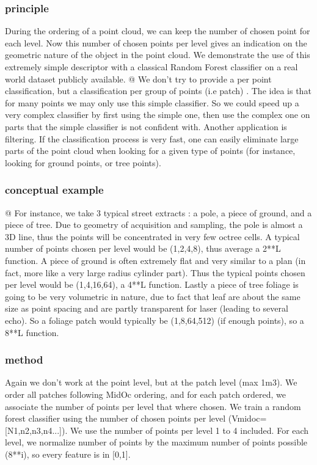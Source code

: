 		\subsubsection{principle}
			During the ordering of a point cloud, we can keep the number of chosen point for each level.
			Now this number of chosen points per level gives an indication on the geometric nature of the object in the point cloud. 
			We demonstrate the use of this extremely simple descriptor with a classical Random Forest classifier on a real world dataset publicly available.
			@
			We don't try to provide a per point classification, but a classification per group of points (i.e patch) . 
			The idea is that for many points we may only use this simple classifier. So we could speed up a very complex classifier by first using the simple one, then use the complex one on parts that the simple classifier is not confident with.
			Another application is filtering. If the classification process is very fast, one can easily eliminate large parts of the point cloud when looking for a given type of points (for instance, looking for ground points, or tree points).
		\subsubsection{conceptual example}
			@
			For instance, we take 3 typical street extracts : a pole, a piece of ground, and a piece of tree.
			Due to geometry of acquisition and sampling, the pole is almost a 3D line, thus the points will be concentrated in very few octree cells.
			A typical number of points chosen per level would be (1,2,4,8), thus average a 2**L function.
			A piece of ground is often extremely flat and very similar to a plan (in  fact, more like a very large radius cylinder part).
			Thus the typical points chosen per level would be (1,4,16,64), a 4**L function.
			Lastly a piece of tree foliage is going to be very volumetric in nature, due to fact that leaf are about the same size as point spacing and are partly transparent for laser (leading to several echo).
			So a foliage patch would typically be (1,8,64,512) (if enough points), so a 8**L function.
			
		\subsubsection{method}
			Again we don't work at the point level, but at the patch level (max 1m3).
			We order all patches following MidOc ordering, and for each patch ordered, we associate the number of points per level that where chosen.
			We train a random forest classifier using the number of chosen points per level (Vmidoc=[N1,n2,n3,n4...]).
			We use the number of points per level 1 to 4 included. For each level, we normalize number of points by the maximum number of points possible (8**i), so every feature is in [0,1].
			
